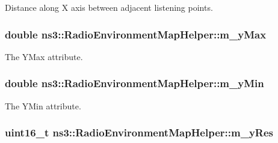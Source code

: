 Distance along X axis between adjacent listening points. 

\subsubsection[{\texorpdfstring{m\+\_\+y\+Max}{m_yMax}}]{\setlength{\rightskip}{0pt plus 5cm}double ns3\+::\+Radio\+Environment\+Map\+Helper\+::m\+\_\+y\+Max\hspace{0.3cm}{\ttfamily [private]}}\hypertarget{classns3_1_1RadioEnvironmentMapHelper_af8f02bf194b74569fb9f6b843d44b2ca}{}\label{classns3_1_1RadioEnvironmentMapHelper_af8f02bf194b74569fb9f6b843d44b2ca}


The {\ttfamily Y\+Max} attribute. 

\subsubsection[{\texorpdfstring{m\+\_\+y\+Min}{m_yMin}}]{\setlength{\rightskip}{0pt plus 5cm}double ns3\+::\+Radio\+Environment\+Map\+Helper\+::m\+\_\+y\+Min\hspace{0.3cm}{\ttfamily [private]}}\hypertarget{classns3_1_1RadioEnvironmentMapHelper_a86310d0183abfba8d6ea5e98eeb7d166}{}\label{classns3_1_1RadioEnvironmentMapHelper_a86310d0183abfba8d6ea5e98eeb7d166}


The {\ttfamily Y\+Min} attribute. 

\subsubsection[{\texorpdfstring{m\+\_\+y\+Res}{m_yRes}}]{\setlength{\rightskip}{0pt plus 5cm}uint16\+\_\+t ns3\+::\+Radio\+Environment\+Map\+Helper\+::m\+\_\+y\+Res\hspace{0.3cm}{\ttfamily [private]}}\hypertarget{classns3_1_1RadioEnvironmentMapHelper_a0d7e6c3089d6f70c1f6a5559162fbb7d}{}\label{classns3_1_1RadioEnvironmentMapHelper_a0d7e6c3089d6f70c1f6a5559162fbb7d}


